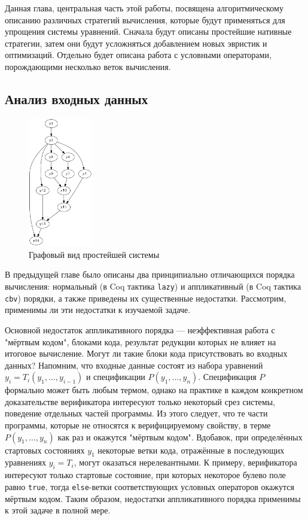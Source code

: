 \documentclass[../thesis.tex]{subfiles}
\begin{document}
\label{sec:2}
\graphicspath{ {../images/} }

Данная глава, центральная часть этой работы, посвящена алгоритмическому описанию различных стратегий вычисления, которые будут применяться для упрощения системы уравнений. Сначала будут описаны простейшие нативные стратегии, затем они будут усложняться добавлением новых эвристик и оптимизаций. Отдельно будет описана работа с условными операторами, порождающими несколько веток вычисления.

\subsection{Анализ входных данных}\label{analysis}

\begin{figure}
    \centering
    \includegraphics[width=0.25\textwidth]{graph_simple1.png}
    \caption{Графовый вид простейшей системы}\label{graph_simple1}
\end{figure}

В предыдущей главе было описаны два принципиально отличающихся порядка вычисления: нормальный (в Coq тактика \texttt{lazy}) и аппликативный (в Coq тактика \texttt{cbv}) порядки, а также приведены их существенные недостатки. Рассмотрим, применимы ли эти недостатки к изучаемой задаче.

Основной недостаток аппликативного порядка --- неэффективная работа с "мёртвым кодом", блоками кода, результат редукции которых не влияет на итоговое вычисление. Могут ли такие блоки кода присутствовать во входных данных? Напомним, что входные данные состоят из набора уравнений $y_i = T_i(y_1, \dots, y_{i - 1})$ и спецификации $P(y_1, \dots, y_n)$. Спецификация $P$ формально может быть любым термом, однако на практике в каждом конкретном доказательстве верификатора интересуют только некоторый срез системы, поведение отдельных частей программы. Из этого следует, что те части программы, которые не относятся к верифицируемому свойству, в терме $P(y_1, \dots, y_n)$ как раз и окажутся "мёртвым кодом". Вдобавок, при определённых стартовых состояниях $y_1$ некоторые ветки кода, отражённые в последующих уравнениях $y_i = T_i$, могут оказаться нерелевантными. К примеру, верификатора интересуют только стартовые состояние, при которых некоторое булево поле равно \texttt{true}, тогда \texttt{else}-ветки соответствующих условных операторов окажутся мёртвым кодом. Таким образом, недостатки аппликативного порядка применимы к этой задаче в полной мере.
\end{document}
